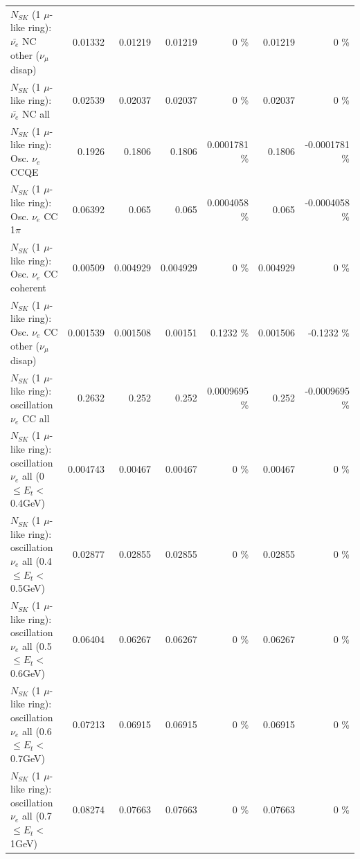 \begin{table}
\begin{tabular}{| l | r | r | r  r | r  r |}
          $N_{SK}$ (1 $\mu$-like ring): $\bar{\nu_e}$ NC other ($\nu_\mu$ disap) &         0.01332 &         0.01219 &         0.01219 &        0 \%  &         0.01219 &        0 \%  \\ 
                            $N_{SK}$ (1 $\mu$-like ring): $\bar{\nu_{e}}$ NC all &         0.02539 &         0.02037 &         0.02037 &        0 \%  &         0.02037 &        0 \%  \\ 
\hline
\hline
\hline
                                 $N_{SK}$ (1 $\mu$-like ring): Osc. $\nu_e$ CCQE &          0.1926 &          0.1806 &          0.1806 & 0.0001781 \%  &          0.1806 & -0.0001781 \%  \\ 
                            $N_{SK}$ (1 $\mu$-like ring): Osc. $\nu_e$ CC 1$\pi$ &         0.06392 &           0.065 &           0.065 & 0.0004058 \%  &           0.065 & -0.0004058 \%  \\ 
                          $N_{SK}$ (1 $\mu$-like ring): Osc. $\nu_e$ CC coherent &         0.00509 &        0.004929 &        0.004929 &        0 \%  &        0.004929 &        0 \%  \\ 
           $N_{SK}$ (1 $\mu$-like ring): Osc. $\nu_e$ CC other ($\nu_\mu$ disap) &        0.001539 &        0.001508 &         0.00151 &   0.1232 \%  &        0.001506 &  -0.1232 \%  \\ 
                        $N_{SK}$ (1 $\mu$-like ring): oscillation $\nu_e$ CC all &          0.2632 &           0.252 &           0.252 & 0.0009695 \%  &           0.252 & -0.0009695 \%  \\ 
\hline
$N_{SK}$ (1 $\mu$-like ring): oscillation $\nu_{e}$ all (0 $\leq E_{t} <$ 0.4GeV) &        0.004743 &         0.00467 &         0.00467 &        0 \%  &         0.00467 &        0 \%  \\ 
$N_{SK}$ (1 $\mu$-like ring): oscillation $\nu_{e}$ all (0.4 $\leq E_{t} <$ 0.5GeV) &         0.02877 &         0.02855 &         0.02855 &        0 \%  &         0.02855 &        0 \%  \\ 
$N_{SK}$ (1 $\mu$-like ring): oscillation $\nu_{e}$ all (0.5 $\leq E_{t} <$ 0.6GeV) &         0.06404 &         0.06267 &         0.06267 &        0 \%  &         0.06267 &        0 \%  \\ 
$N_{SK}$ (1 $\mu$-like ring): oscillation $\nu_{e}$ all (0.6 $\leq E_{t} <$ 0.7GeV) &         0.07213 &         0.06915 &         0.06915 &        0 \%  &         0.06915 &        0 \%  \\ 
$N_{SK}$ (1 $\mu$-like ring): oscillation $\nu_{e}$ all (0.7 $\leq E_{t} <$ 1GeV) &         0.08274 &         0.07663 &         0.07663 &        0 \%  &         0.07663 &        0 \%  \\ 

\end{tabular}
\end{table}
